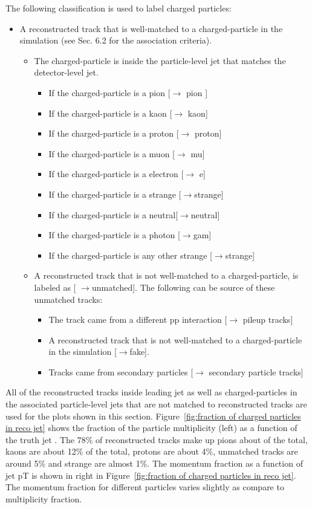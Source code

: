 The following classification is used to label charged particles:
\begin{itemize}
\item A reconstructed track that is well-matched to a charged-particle in the simulation (see Sec. 6.2 for
the association criteria).
\begin{itemize}
\item The charged-particle is inside the particle-level jet that matches the detector-level jet.
\begin{itemize}
\item  If the charged-particle is a pion [$\rightarrow$ pion ]
\item  If the charged-particle is a kaon [$\rightarrow$ kaon]
\item  If the charged-particle is a proton [$\rightarrow$ proton]
\item  If the charged-particle is a muon [$\rightarrow$ mu]
\item  If the charged-particle is a electron [$\rightarrow$ e]
\item  If the charged-particle is a strange [$\rightarrow$strange]
\item  If the charged-particle is a neutral[$\rightarrow$neutral]
\item  If the charged-particle is a photon [$\rightarrow$gam]
\item  If the charged-particle is any other strange [$\rightarrow$strange]
\end{itemize}
\item A reconstructed track that is not well-matched to a charged-particle, is labeled as [ $\rightarrow$unmatched]. The following can be source of these unmatched tracks:
\begin{itemize}
\item The track came from a different pp interaction [$\rightarrow$ pileup tracks]
\item A reconstructed track that is not well-matched to a charged-particle in the simulation [$\rightarrow$fake].
\item Tracks came from secondary particles [$\rightarrow$ secondary particle tracks]
\end{itemize}
\end{itemize}
\end{itemize}

All of the reconstructed tracks inside leading jet as well as charged-particles in the associated particle-level jets that are not matched to reconstructed tracks are used for the plots shown in this section. Figure~\ref{fig:fraction of charged particles in reco jet} shows the fraction of the particle multiplicity (left) as a function of the truth jet \pT. The 78\% of reconstructed tracks make up pions about of the total, kaons are about 12\% of the total, protons are about 4\%, unmatched tracks are around 5\% and strange are almost 1\%. The momentum fraction as a function of jet pT is shown in right in Figure~\ref{fig:fraction of charged particles in reco jet}. The momentum fraction for different particles varies slightly as compare to multiplicity fraction.

